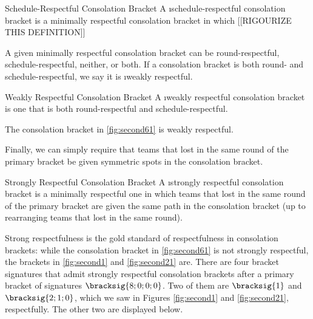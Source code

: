 {    \begin{definition}{Schedule-Respectful Consolation Bracket}{}
        A \i{schedule-respectful} consolation bracket is a minimally respectful consolation bracket in which [[RIGOURIZE THIS DEFINITION]]
    \end{definition}

    A given minimally respectful consolation bracket can be round-respectful, schedule-respectful, neither, or both. If a consolation bracket is both round- and schedule-respectful, we say it is \i{weakly respectful}.

    \begin{definition}{Weakly Respectful Consolation Bracket}{}
        A \i{weakly respectful} consolation bracket is  one that is both round-respectful and schedule-respectful.
    \end{definition}

    The consolation bracket in \ref{fig:second61} is weakly respectful.


    Finally, we can simply require that teams that lost in the same round of the primary bracket be given symmetric spots in the consolation bracket.

    \begin{definition}{Strongly Respectful Consolation Bracket}{}
        A \i{strongly respectful} consolation bracket is a minimally respectful one in which teams that lost in the same round of the primary bracket are given the same path in the consolation bracket (up to rearranging teams that lost in the same round).
    \end{definition}

    Strong respectfulness is the gold standard of respectfulness in consolation brackets: while the consolation bracket in \ref{fig:second61} is not strongly respectful, the brackets in \ref{fig:second1} and \ref{fig:second21} are. There are four bracket signatures that admit strongly respectful consolation brackets after a primary bracket of signatures $\bracksig{8;0;0;0}$. Two of them are $\bracksig{1}$ and $\bracksig{2;1;0}$, which we saw in Figures \ref{fig:second1} and \ref{fig:second21}, respectfully. The other two are displayed below.



}

